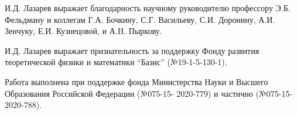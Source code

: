 И.Д. Лазарев выражает благодарность научному руководителю профессору Э.Б. Фельдману
и коллегам
Г.А. Бочкину,
С.Г. Васильеву,
С.И. Доронину,
А.И. Зенчуку,
Е.И. Кузнецовой,
и А.H. Пыркову.

И.Д. Лазарев выражает признательность за поддержку Фонду развития теоретической физики и математики ``Базис'' (№19-1-5-130-1).

Работа выполнена при поддержке фонда Министерства Науки и Высшего Образования Российской Федерации (№075-15- 2020-779) и частично (№075-15-2020-788).
